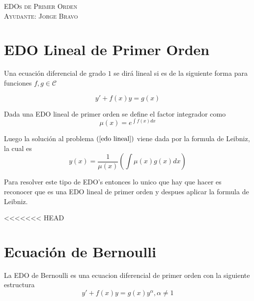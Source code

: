 \documentclass[a4paper,oneside,10.5pt]{article}
\begin{document}
\begin{center}
{\Large \textsc{EDOs de Primer Orden}}\\
\vspace{1em}
\textsc{Ayudante: Jorge Bravo}\\
\end{center}

\section*{EDO Lineal de Primer Orden}
Una ecuación diferencial de grado $1$ se dirá lineal si es de la siguiente forma para funciones $f,g \in \mathcal{C}$

\begin{equation}
  \label{edo lineal}
  y' + f(x)y = g(x)
\end{equation}

Dada una EDO lineal de primer orden se define el factor integrador como
\begin{equation*}
  \mu(x) = e^{\int f(x) dx}
\end{equation*}

Luego la solución al problema $(\ref{edo lineal})$ viene dada por la formula de Leibniz, la cual es
\begin{equation*}
  y(x) = \frac{1}{\mu(x)} (\int \mu(x) g(x) dx)
\end{equation*}

Para resolver este tipo de EDO's entonces lo unico que hay que hacer es reconocer que es una EDO lineal de primer orden y despues aplicar la formula de Leibniz.

\begin{ejemplo}

\end{ejemplo}

<<<<<<< HEAD
\section*{Ecuaci\'on de Bernoulli}
La EDO de Bernoulli es una ecuacion diferencial de primer orden con la siguiente estructura
\begin{equation*}
  y' + f(x) y = g(x)y^{\alpha}, \alpha \neq 1
\end{equation*}
\end{document}
